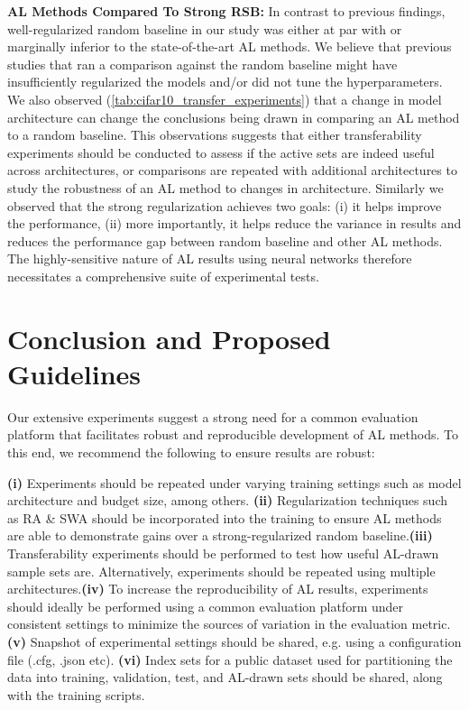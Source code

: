 \documentclass[10pt,twocolumn,letterpaper]{article}
\begin{document}
\noindent \textbf{AL Methods Compared To Strong RSB:} In contrast to previous findings, well-regularized random baseline in our study was either at par with or marginally inferior to the state-of-the-art AL methods. We believe that previous studies that ran a comparison against the random baseline might have insufficiently regularized the models and/or did not tune the hyperparameters. We also observed (\cref{tab:cifar10_transfer_experiments}) that a change in model architecture can change the conclusions being drawn in comparing an AL method to a random baseline. This observations suggests that either transferability experiments should be conducted to assess if the active sets are indeed useful across architectures, or comparisons are repeated with additional architectures to study the robustness of an AL method to changes in architecture. Similarly we observed that the strong regularization achieves two goals: (i) it helps improve the performance, (ii) more importantly, it helps reduce the variance in results and reduces the performance gap between random baseline and other AL methods. The highly-sensitive nature of AL results using neural networks therefore necessitates a comprehensive suite of experimental tests.

\section{Conclusion and Proposed Guidelines}
Our extensive experiments suggest a strong need for a common evaluation platform that facilitates robust and reproducible development of AL methods. To this end, we recommend the following to ensure results are robust: 

\textbf{(i)} Experiments should be repeated under varying training settings such as model architecture and budget size, among others. \textbf{(ii)} Regularization techniques such as RA \& SWA should be incorporated into the training to ensure AL methods are able to demonstrate gains over a strong-regularized random baseline.\textbf{(iii)} Transferability experiments should be performed to test how useful AL-drawn sample sets are. Alternatively, experiments should be repeated using multiple architectures.\textbf{(iv)} To increase the reproducibility of AL results, experiments should ideally be performed using a common evaluation platform under consistent settings to minimize the sources of variation in the evaluation metric. \textbf{(v)} Snapshot of experimental settings should be shared, e.g. using a configuration file (.cfg, .json etc). \textbf{(vi)} Index sets for a public dataset used for partitioning the data into training, validation, test, and AL-drawn sets should be shared, along with the training scripts. 
\end{document}
